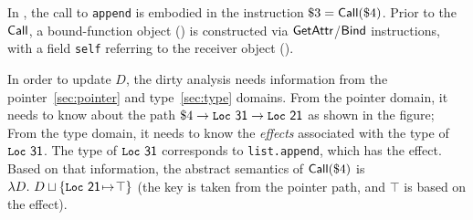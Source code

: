 \bgroup
\setlength\intextsep{-10pt}
\begin{wrapfigure}{r}{0.3\textwidth}
\vspace{5pt}
\end{wrapfigure}

%
In \spytecode, the call to \lstinline|append| is embodied
in the instruction $\$3 = \textsf{Call}(\$4)$.
Prior to the $\textsf{Call}$, a bound-function object () is
constructed via $\textsf{GetAttr}$/$\textsf{Bind}$ instructions, with a field
\lstinline|self| referring to the receiver object ().

In order to update $D$, the dirty analysis needs information from the pointer~\cref{sec:pointer} and type~\cref{sec:type} domains.
From the pointer domain, it needs to know about the path $\$4\to\textsf{\texttt{\small Loc}~{31}} \to \textsf{\texttt{\small Loc}~{21}}$
as shown in the figure;
From the type domain, it needs to know the \emph{effects}
associated with the type of $\textsf{\texttt{\small Loc}~{31}}$.
The type of $\textsf{\texttt{\small Loc}~{31}}$ corresponds to \texttt{list.append},
which has the \tupdate effect.
Based on that information, the abstract semantics of
$\textsf{Call}(\$4)$ is $\lambda D.~D\sqcup\{\textsf{\texttt{\small Loc}~{21}}{\hspace{1pt}\mapsto\hspace{1pt}}\top\}$ (the key  is taken from the pointer path, and $\top$ is based on the \tupdate
effect).

